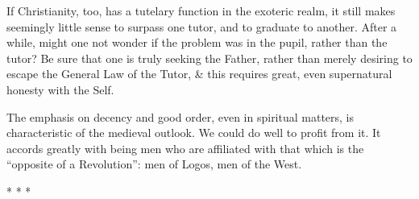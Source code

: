 If Christianity, too, has a tutelary function in the exoteric realm, it still makes seemingly little sense to surpass one tutor, and to graduate to another. After a while, might one not wonder if the problem was in the pupil, rather than the tutor? Be sure that one is truly seeking the Father, rather than merely desiring to escape the General Law of the Tutor, \& this requires great, even supernatural honesty with the Self.

The emphasis on decency and good order, even in spiritual matters, is characteristic of the medieval outlook. We could do well to profit from it. It accords greatly with being men who are affiliated with that which is the ``opposite of a Revolution'': men of Logos, men of the West.



\begin{center}* * *\end{center}

